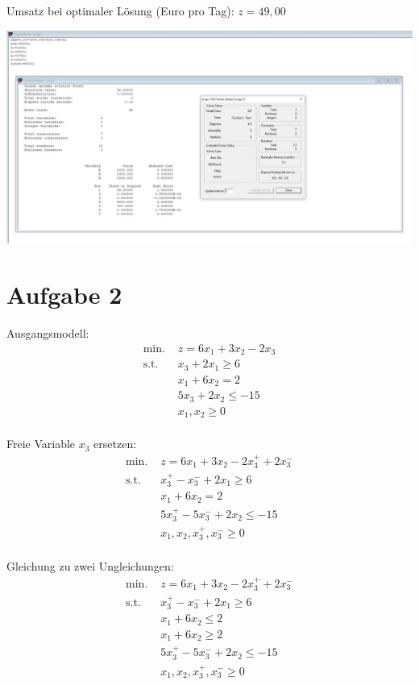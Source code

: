 \documentclass[a4paper,11pt]{article}
\begin{document}
Umsatz bei optimaler Lösung (Euro pro Tag): $z = 49,00$ \\

\begin{centering}
	\includegraphics[width=1\linewidth]{src/solver_aufg_1.jpeg}
\end{centering}

\section*{Aufgabe 2}
Ausgangsmodell:
\begin{align*}
    \text{min. } & z = 6x_{1} + 3x_{2} - 2x_{3} \\
    \text{s.t. } & x_{3} + 2x_{1} \ge 6 \\
    & x_{1} + 6x_{2} = 2 \\
    & 5x_{3} + 2x_{2} \le -15 \\
    & x_{1}, x_{2} \ge 0 \\
\end{align*}

Freie Variable $x_{3}$ ersetzen:
\begin{align*}
    \text{min. } & z = 6x_{1} + 3x_{2} - 2x_{3}^{+} + 2x_{3}^{-}\\
    \text{s.t. } & x_{3}^{+} - x_{3}^{-} + 2x_{1} \ge 6 \\
    & x_{1} + 6x_{2} = 2 \\
    & 5x_{3}^{+} - 5x_{3}^{-} + 2x_{2} \le -15 \\
    & x_{1}, x_{2}, x_{3}^{+}, x_{3}^{-} \ge 0 \\
\end{align*}

Gleichung zu zwei Ungleichungen:
\begin{align*}
    \text{min. } & z = 6x_{1} + 3x_{2} - 2x_{3}^{+} + 2x_{3}^{-}\\
    \text{s.t. } & x_{3}^{+} - x_{3}^{-} + 2x_{1} \ge 6 \\
    & x_{1} + 6x_{2} \le 2 \\
    & x_{1} + 6x_{2} \ge 2 \\
    & 5x_{3}^{+} - 5x_{3}^{-} + 2x_{2} \le -15 \\
    & x_{1}, x_{2}, x_{3}^{+}, x_{3}^{-} \ge 0 \\
\end{align*}
\end{document}
